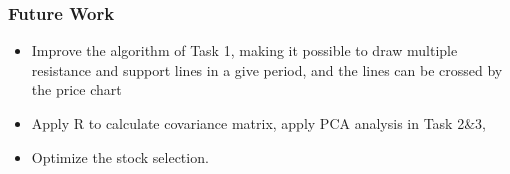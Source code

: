 \documentclass[compress,handout,10pt]{beamer}
\let\olditem\item
\renewcommand{\item}{\setlength{\itemsep}{0.5\baselineskip}\olditem}
\begin{document}
\begin{frame}
    \frametitle{Future Work}
\begin {itemize}
\item Improve the algorithm of Task 1, making it possible to draw multiple resistance and support lines in a give period, and the lines can be crossed by the price chart
\item Apply R to calculate covariance matrix, apply PCA analysis in Task 2\&3,
\item Optimize the stock selection.
\end{itemize}
\end{frame}
\end{document}
